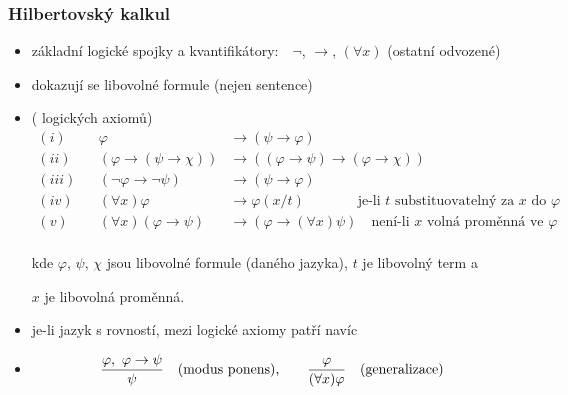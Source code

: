 \subsubsection*{Hilbertovský kalkul}
    \begin{itemize}
    \item základní logické spojky a kvantifikátory:\ \ $\neg$, $\to$, $(\forall x)$ (ostatní odvozené)
    
    \item dokazují se libovolné formule (nejen sentence)
    
    \item {} ( logických axiomů)
    \vspace{-2mm}\begin{align*}(i)& &\varphi &\to (\psi \to \varphi) \\
    (ii)& &(\varphi\to (\psi \to \chi))&\to ((\varphi \to \psi)\to(\varphi \to \chi))\qquad\qquad\qquad\qquad\phantom{\ } \\
    (iii)& &(\neg \varphi \to \neg \psi)&\to(\psi \to \varphi)\\
    (iv)& &(\forall x)\varphi &\to\varphi(x/t)\quad\quad\quad\ \ \!\text{ je-li $t$ substituovatelný za $x$ do $\varphi$}\\
    (v)& &(\forall x)(\varphi \to \psi)&\to(\varphi \to (\forall x)\psi)\quad\text{není-li $x$ volná proměnná ve $\varphi$}\\
    \end{align*}
    
    \vspace{-6mm}
    kde $\varphi$, $\psi$, $\chi$ jsou libovolné formule (daného jazyka), $t$ je libovolný term a
    \vspace{0.5mm}
    
    $x$ je libovolná proměnná.
    \smallskip
    
    \item je-li jazyk s rovností, mezi logické axiomy patří navíc 
    
    \item {}
    \vspace{-2mm}
    $$\frac{\varphi,\ \varphi \to \psi}{\psi}\quad\text{{(modus ponens)},}\qquad\frac{\varphi}{(\forall x)\varphi}\quad\text{{(generalizace)}}$$
    \end{itemize}
    
    
    
